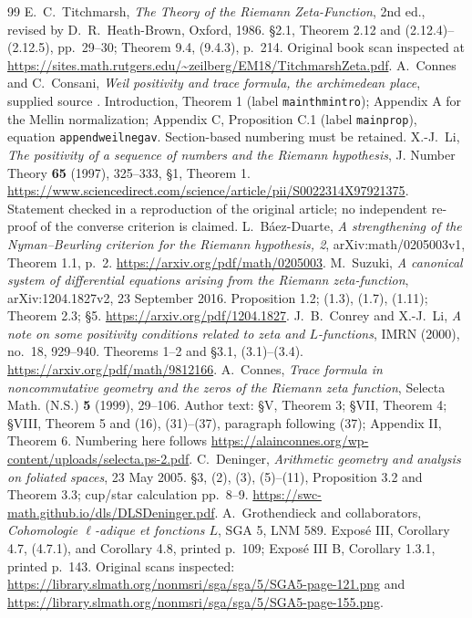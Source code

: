 \documentclass[11pt,a4paper]{article}
\begin{document}
\begin{thebibliography}{99}
 E.~C.~Titchmarsh, \emph{The Theory of the Riemann Zeta-Function}, 2nd ed., revised by D.~R.~Heath-Brown, Oxford, 1986. \S2.1, Theorem 2.12 and (2.12.4)--(2.12.5), pp.~29--30; Theorem 9.4, (9.4.3), p.~214. Original book scan inspected at \url{https://sites.math.rutgers.edu/~zeilberg/EM18/TitchmarshZeta.pdf}.
 A.~Connes and C.~Consani, \emph{Weil positivity and trace formula, the archimedean place}, supplied source . Introduction, Theorem 1 (label \texttt{mainthmintro}); Appendix A for the Mellin normalization; Appendix C, Proposition C.1 (label \texttt{mainprop}), equation \texttt{appendweilnegav}. Section-based numbering must be retained.
 X.-J.~Li, \emph{The positivity of a sequence of numbers and the Riemann hypothesis}, J. Number Theory \textbf{65} (1997), 325--333, \S1, Theorem 1. \url{https://www.sciencedirect.com/science/article/pii/S0022314X97921375}. Statement checked in a reproduction of the original article; no independent re-proof of the converse criterion is claimed.
 L.~B\'aez-Duarte, \emph{A strengthening of the Nyman--Beurling criterion for the Riemann hypothesis, 2}, arXiv:math/0205003v1, Theorem 1.1, p.~2. \url{https://arxiv.org/pdf/math/0205003}.
 M.~Suzuki, \emph{A canonical system of differential equations arising from the Riemann zeta-function}, arXiv:1204.1827v2, 23 September 2016. Proposition 1.2; (1.3), (1.7), (1.11); Theorem 2.3; \S5. \url{https://arxiv.org/pdf/1204.1827}.
 J.~B.~Conrey and X.-J.~Li, \emph{A note on some positivity conditions related to zeta and $L$-functions}, IMRN (2000), no.~18, 929--940. Theorems 1--2 and \S3.1, (3.1)--(3.4). \url{https://arxiv.org/pdf/math/9812166}.
 A.~Connes, \emph{Trace formula in noncommutative geometry and the zeros of the Riemann zeta function}, Selecta Math. (N.S.) \textbf{5} (1999), 29--106. Author text: \S V, Theorem 3; \S VII, Theorem 4; \S VIII, Theorem 5 and (16), (31)--(37), paragraph following (37); Appendix II, Theorem 6. Numbering here follows \url{https://alainconnes.org/wp-content/uploads/selecta.ps-2.pdf}.
 C.~Deninger, \emph{Arithmetic geometry and analysis on foliated spaces}, 23 May 2005. \S3, (2), (3), (5)--(11), Proposition 3.2 and Theorem 3.3; cup/star calculation pp.~8--9. \url{https://swc-math.github.io/dls/DLSDeninger.pdf}.
 A.~Grothendieck and collaborators, \emph{Cohomologie $\ell$-adique et fonctions $L$}, SGA 5, LNM 589. Expos\'e III, Corollary 4.7, (4.7.1), and Corollary 4.8, printed p.~109; Expos\'e III B, Corollary 1.3.1, printed p.~143. Original scans inspected: \url{https://library.slmath.org/nonmsri/sga/sga/5/SGA5-page-121.png} and \url{https://library.slmath.org/nonmsri/sga/sga/5/SGA5-page-155.png}.

\end{thebibliography}
\end{document}

